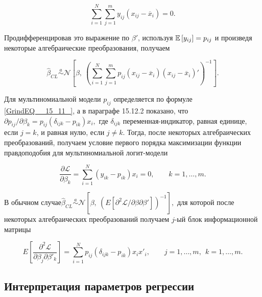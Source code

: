 \begin{equation} \label{GrindEQ__15_14_} \sum^N_{i=1}{\sum^m_{j=1}{y_{ij}\left(x_{ij}-{\overline{x}}_i\right)=0.}} \end{equation} 

Продифференцировав это выражение по $\beta '$, используя $\mathbb{E}\left[y_{ij}\right]=p_{ij}$ и произведя некоторые алгебраические преобразования, получаем

\begin{equation} \label{GrindEQ__15_15_} {\widehat{\beta }}_{CL}\overset{a}{\sim }
{\mathcal N}\left[\beta ,\ {\left(\sum^N_{i=1}{\sum^m_{j=1}{p_{ij}}}\left(x_{ij}-{\overline{x}}_i\right)\left(x_{ij}-{\overline{x}}_i\right)'\right)}^{-1}\right]. \end{equation} 

Для мультиномиальной модели $p_{ij}$ определяется по формуле \eqref{GrindEQ__15_11_}, а в параграфе 15.12.2 показано, что ${\partial p_{ij}}/{\partial {\beta }_k}=p_{ij}\left({\delta }_{ijk}-p_{ik}\right)x_i,$ где ${\delta }_{ijk}$ переменная-индикатор, равная единице, если $j=k$, и равная нулю, если $j\ne k.$ Тогда, после некоторых алгебраических преобразований, получаем условие первого порядка максимизации функции правдоподобия для мультиномиальной логит-модели

\begin{equation} \label{GrindEQ__15_16_} \frac{\partial {\mathcal L}}{\partial {\beta }_k}=\sum^N_{i=1}{\left(y_{ik}-p_{ik}\right)x_i=0,\ \ \ \ \ \ \ \ \ k=1,\dots ,m.} \end{equation} 

В обычном случае${\widehat{\beta }}_{CL}\overset{a}{\sim }
{\mathcal N}\left[\beta ,\ {\left(E\left[{{\partial }^2{\mathcal L}}/{\partial\beta \partial{\beta }'}\right]\right)}^{-1}\right],$ для которой после некоторых алгебраических преобразований получаем $j$-ый блок информационной матрицы

\begin{equation} \label{GrindEQ__15_17_} E\left[\frac{{\partial }^2{\mathcal L}}{\partial {\beta }_j\partial {\beta }'_k}\right]=\sum^N_{i=1}{p_{ij}\left({\delta }_{ijk}-p_{ik}\right)x_ix'_i},\ \ \ \ \ \ \ \ \ j=1,\dots ,m,\ \ k=1,\dots ,m. \end{equation} 

\subsection{Интерпретация параметров регрессии}

